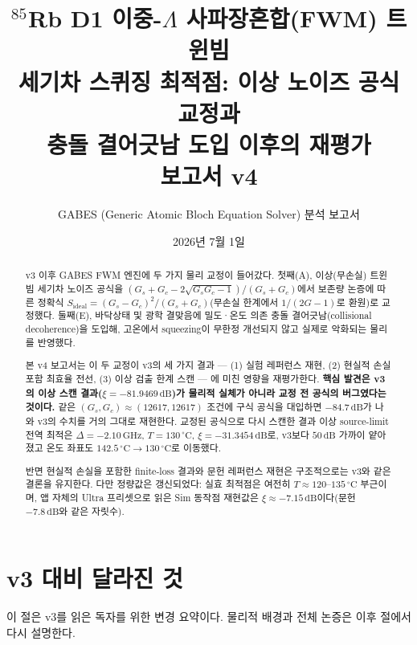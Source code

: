 \documentclass[11pt,a4paper]{article}
\title{\textbf{$^{85}$Rb D1 이중-$\Lambda$ 사파장혼합(FWM) 트윈빔\\
세기차 스퀴징 최적점: 이상 노이즈 공식 교정과\\
충돌 결어긋남 도입 이후의 재평가}\\[4pt]
\large 보고서 v4}
\author{GABES (Generic Atomic Bloch Equation Solver) 분석 보고서}
\date{2026년 7월 1일}
\newcommand{\dB}{\,\mathrm{dB}}
\newcommand{\GHz}{\,\mathrm{GHz}}
\newcommand{\degC}{\,^{\circ}\mathrm{C}}
\begin{document}
\maketitle

\begin{abstract}
\noindent
v3 이후 GABES FWM 엔진에 두 가지 물리 교정이 들어갔다. 첫째(A), 이상(무손실)
트윈빔 세기차 노이즈 공식을 $(G_s+G_c-2\sqrt{G_sG_c-1})/(G_s+G_c)$에서 보존량
논증에 따른 정확식 $S_{\mathrm{ideal}}=(G_s-G_c)^2/(G_s+G_c)$(무손실 한계에서
$1/(2G-1)$로 환원)로 교정했다. 둘째(E), 바닥상태 및 광학 결맞음에 밀도·온도
의존 충돌 결어긋남(collisional decoherence)을 도입해, 고온에서 squeezing이
무한정 개선되지 않고 실제로 악화되는 물리를 반영했다.

본 v4 보고서는 이 두 교정이 v3의 세 가지 결과 — (1) 실험 레퍼런스 재현,
(2) 현실적 손실 포함 최효율 전선, (3) 이상 검출 한계 스캔 — 에 미친 영향을
재평가한다. \textbf{핵심 발견은 v3의 이상 스캔 결과($\xi=-81.9469\dB$)가 물리적
실체가 아니라 교정 전 공식의 버그였다는 것이다.} 같은 $(G_s,G_c)\approx(12617,
12617)$ 조건에 구식 공식을 대입하면 $-84.7\dB$가 나와 v3의 수치를 거의 그대로
재현한다. 교정된 공식으로 다시 스캔한 결과 이상 source-limit 전역 최적은
$\Delta=-2.10\GHz$, $T=130\degC$, $\xi=-31.3454\dB$로, v3보다 $50\dB$ 가까이
얕아졌고 온도 좌표도 $142.5\degC\to130\degC$로 이동했다.

반면 현실적 손실을 포함한 finite-loss 결과와 문헌 레퍼런스 재현은 구조적으로는
v3와 같은 결론을 유지한다. 다만 정량값은 갱신되었다: 실효 최적점은 여전히
$T\approx120$--$135\degC$ 부근이며, 앱 자체의 Ultra 프리셋으로 읽은 Sim 동작점
재현값은 $\xi\approx-7.15\dB$이다(문헌 $-7.8\dB$와 같은 자릿수).
\end{abstract}

\tableofcontents
\bigskip

\section{v3 대비 달라진 것}
이 절은 v3를 읽은 독자를 위한 변경 요약이다. 물리적 배경과 전체 논증은 이후
절에서 다시 설명한다.
\end{document}
